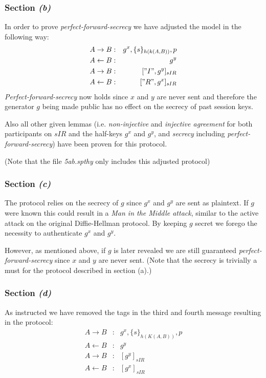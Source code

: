\documentclass[a4paper]{article}
\begin{document}
\subsubsection{Section {\it\bf (b)}}
In order to prove {\em perfect-forward-secrecy} we have adjusted the model in the following way:
\begin{eqnarray*}
A \to B        & : & {g^x}, \{s\}_{h(k(A,B))}, p\\
A \leftarrow B & : & {g^y}\\
A \to B        & : & ["I",{g^y}]_{sIR}\\
A \leftarrow B & : & ["R",{g^x}]_{sIR} 
\end{eqnarray*}
{\em Perfect-forward-secrecy} now holds since $x$ and $y$ are never sent and therefore the generator $g$ being made public has no effect on the secrecy of past session keys.\par Also all other given lemmas (i.e. {\em non-injective} and {\em injective agreement} for both participants on $sIR$ and the half-keys ${g^x}$ and ${g^y}$, and {\em secrecy} including {\em perfect-forward-secrecy}) have been proven for this protocol. \par \noindent (Note that the file {\em 5ab.spthy} only includes this adjusted protocol)
\subsubsection{Section {\it\bf (c)}}
The protocol relies on the secrecy of $g$ since $g^x$ and $g^y$ are sent as plaintext. If $g$ were known this could result in a {\em Man in the Middle attack}, similar to the active attack on the original Diffie-Hellman protocol. By keeping $g$ secret we forego the necessity to authenticate $g^x$ and $g^y$. \par
However, as mentioned above, if $g$ is later revealed we are still guaranteed {\em perfect-forward-secrecy} since $x$ and $y$ are never sent. (Note that the secrecy is trivially a must for the protocol described in section {(a)}.)
\subsubsection{Section {\it\bf (d)}}
As instructed we have removed the tags in the third and fourth message resulting in the protocol:
\begin{eqnarray*}
A \to B        & : & {g^x}, \{s\}_{h(K(A,B))}, p\\
A \leftarrow B & : & {g^y}\\
A \to B        & : & [{g^y}]_{sIR}\\
A \leftarrow B & : & [{g^x}]_{sIR} 
\end{eqnarray*}
\end{document}
